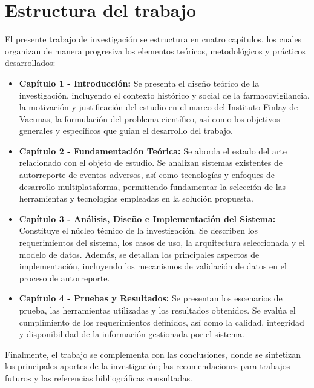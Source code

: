 \section{Estructura del trabajo}\label{section:estructuraTrabajo}

El presente trabajo de investigación se estructura en cuatro capítulos, los cuales organizan de manera progresiva los elementos teóricos, metodológicos y prácticos desarrollados:

\begin{itemize}
    \item \textbf{Capítulo 1 - Introducción:} Se presenta el diseño teórico de la investigación, incluyendo el contexto histórico y social de la farmacovigilancia, la motivación y justificación del estudio en el marco del Instituto Finlay de Vacunas, la formulación del problema científico, así como los objetivos generales y específicos que guían el desarrollo del trabajo.

    \item \textbf{Capítulo 2 - Fundamentación Teórica:} Se aborda el estado del arte relacionado con el objeto de estudio. Se analizan sistemas existentes de autorreporte de eventos adversos, así como tecnologías y enfoques de desarrollo multiplataforma, permitiendo fundamentar la selección de las herramientas y tecnologías empleadas en la solución propuesta.

    \item \textbf{Capítulo 3 - Análisis, Diseño e Implementación del Sistema:} Constituye el núcleo técnico de la investigación. Se describen los requerimientos del sistema, los casos de uso, la arquitectura seleccionada y el modelo de datos. Además, se detallan los principales aspectos de implementación, incluyendo los mecanismos de validación de datos en el proceso de autorreporte.

    \item \textbf{Capítulo 4 - Pruebas y Resultados:} Se presentan los escenarios de prueba, las herramientas utilizadas y los resultados obtenidos. Se evalúa el cumplimiento de los requerimientos definidos, así como la calidad, integridad y disponibilidad de la información gestionada por el sistema.
\end{itemize}

Finalmente, el trabajo se complementa con las conclusiones, donde se sintetizan los principales aportes de la investigación; las recomendaciones para trabajos futuros y las referencias bibliográficas consultadas.
